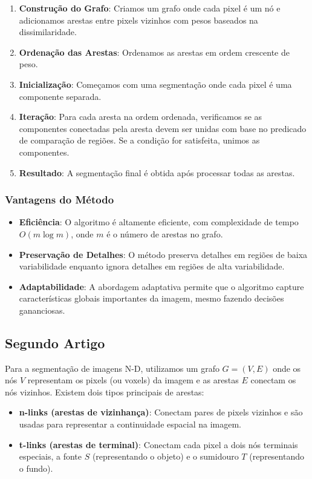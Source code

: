 \documentclass[12pt]{article}
\begin{document}
\begin{enumerate}
    \item \textbf{Construção do Grafo}: Criamos um grafo onde cada pixel é um nó e adicionamos arestas entre pixels vizinhos com pesos baseados na dissimilaridade.
    \item \textbf{Ordenação das Arestas}: Ordenamos as arestas em ordem crescente de peso.
    \item \textbf{Inicialização}: Começamos com uma segmentação onde cada pixel é uma componente separada.
    \item \textbf{Iteração}: Para cada aresta na ordem ordenada, verificamos se as componentes conectadas pela aresta devem ser unidas com base no predicado de comparação de regiões. Se a condição for satisfeita, unimos as componentes.
    \item \textbf{Resultado}: A segmentação final é obtida após processar todas as arestas.
\end{enumerate}

\subsubsection{Vantagens do Método}

\begin{itemize}
    \item \textbf{Eficiência}: O algoritmo é altamente eficiente, com complexidade de tempo \( O(m \log m) \), onde \( m \) é o número de arestas no grafo.
    \item \textbf{Preservação de Detalhes}: O método preserva detalhes em regiões de baixa variabilidade enquanto ignora detalhes em regiões de alta variabilidade.
    \item \textbf{Adaptabilidade}: A abordagem adaptativa permite que o algoritmo capture características globais importantes da imagem, mesmo fazendo decisões gananciosas.
\end{itemize}

\subsection{Segundo Artigo}
Para a segmentação de imagens N-D, utilizamos um grafo \( G = (V, E) \) onde os nós \( V \) representam os pixels (ou voxels) da imagem e as arestas \( E \) conectam os nós vizinhos. Existem dois tipos principais de arestas:

\begin{itemize}
    \item \textbf{n-links (arestas de vizinhança)}: Conectam pares de pixels vizinhos e são usadas para representar a continuidade espacial na imagem.
    \item \textbf{t-links (arestas de terminal)}: Conectam cada pixel a dois nós terminais especiais, a fonte \( S \) (representando o objeto) e o sumidouro \( T \) (representando o fundo).
\end{itemize}
\end{document}
